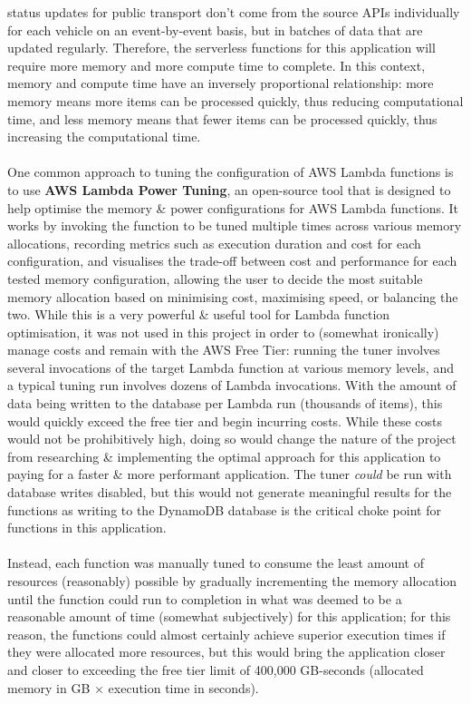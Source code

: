 \documentclass[a4paper,11pt]{report}
\begin{document}
status updates for public transport don't come from the source APIs individually for each vehicle on an event-by-event basis, but in batches of data that are updated regularly.
Therefore, the serverless functions for this application will require more memory and more compute time to complete.
In this context, memory and compute time have an inversely proportional relationship:
more memory means more items can be processed quickly, thus reducing computational time, and less memory means that fewer items can be processed quickly, thus increasing the computational time.
\\\\
One common approach to tuning the configuration of AWS Lambda functions is to use \textbf{AWS Lambda Power Tuning}\supercite{awsPowerTuning}, an open-source tool that is designed to help optimise the memory \& power configurations for AWS Lambda functions.
It works by invoking the function to be tuned multiple times across various memory allocations, recording metrics such as execution duration and cost for each configuration, and visualises the trade-off between cost and performance for each tested memory configuration, allowing the user to decide the most suitable memory allocation based on minimising cost, maximising speed, or balancing the two.
While this is a very powerful \& useful tool for Lambda function optimisation, it was not used in this project in order to (somewhat ironically) manage costs and remain with the AWS Free Tier:
running the tuner involves several invocations of the target Lambda function at various memory levels, and a typical tuning run involves dozens of Lambda invocations.
With the amount of data being written to the database per Lambda run (thousands of items), this would quickly exceed the free tier and begin incurring costs.
While these costs would not be prohibitively high, doing so would change the nature of the project from researching \& implementing the optimal approach for this application to paying for a faster \& more performant application.
The tuner \textit{could} be run with database writes disabled, but this would not generate meaningful results for the functions as writing to the DynamoDB database is the critical choke point for functions in this application.
\\\\
Instead, each function was manually tuned to consume the least amount of resources (reasonably) possible by gradually incrementing the memory allocation until the function could run to completion in what was deemed to be a reasonable amount of time (somewhat subjectively) for this application;
for this reason, the functions could almost certainly achieve superior execution times if they were allocated more resources, but this would bring the application closer and closer to exceeding the free tier limit of 400,000 GB-seconds (allocated memory in GB $\times$ execution time in seconds).
\end{document}
